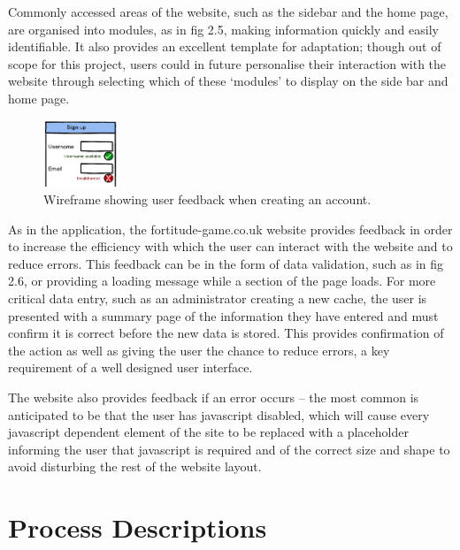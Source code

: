 Commonly accessed areas of the website, such as the sidebar and the home page, are organised into modules, as in fig 2.5, making information quickly and easily identifiable. It also provides an excellent template for adaptation; though out of scope for this project, users could in future personalise their interaction with the website through selecting which of these ‘modules’ to display on the side bar and home page. 

\begin{figure}
	\vspace{-20pt}
	\begin{center}
	\includegraphics[width=0.2\textwidth]{images/sign_up_wireframe}
	\caption{Wireframe showing user feedback when creating an account.}
	\end{center}
	\vspace{-20pt}
\end{figure}

As in the application, the fortitude-game.co.uk website provides feedback in order to increase the efficiency with which the user can interact with the website and to reduce errors. This feedback can be in the form of data validation, such as in fig 2.6, or providing  a loading message while a section of the page loads. For more critical data entry, such as an administrator creating a new cache, the user is presented with a summary page of the information they have entered and must confirm it is correct before the new data is stored. This provides confirmation of the action as well as giving the user the chance to reduce errors, a key requirement of a well designed user interface.

The website also provides feedback if an error occurs – the most common is anticipated to be that the user has javascript disabled, which will cause every javascript dependent element of the site to be replaced with a placeholder informing the user that javascript is required and of the correct size and shape to avoid disturbing the rest of the website layout.

\section{Process Descriptions}
